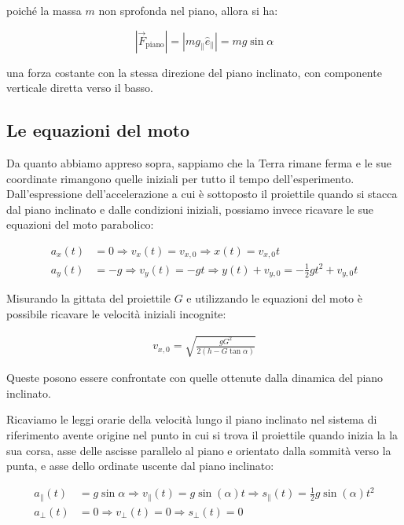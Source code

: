 \documentclass{article}
\begin{document}
poiché la massa $m$ non sprofonda nel piano, allora si ha:

\begin{equation}
|\vec{F}_\text{piano}| =  |mg_\parallel\hat{e}_\parallel| = mg \sin\alpha
\end{equation}

una forza costante con la stessa direzione del piano inclinato,
con componente verticale diretta verso il basso.

\subsection{Le equazioni del moto}
Da quanto abbiamo appreso sopra, sappiamo che la Terra rimane ferma
e le sue coordinate rimangono quelle iniziali per tutto il tempo
dell'esperimento.
Dall'espressione dell'accelerazione a cui è sottoposto il proiettile
quando si stacca dal piano inclinato e dalle condizioni iniziali,
possiamo invece ricavare le sue equazioni del moto parabolico:

\begin{align}
a_x(t) &= 0 \Rightarrow v_x(t) = v_{x,0} \Rightarrow x(t) = v_{x,0}t \\
a_y(t) &= -g \Rightarrow v_y(t) = - g t \Rightarrow y(t) + v_{y,0} = - \frac{1}{2} g t^2 + v_{y,0} t  
\end{align}

Misurando la gittata del proiettile $G$ e utilizzando le equazioni del
moto è possibile ricavare le velocità iniziali incognite:

\begin{align}
v_{x,0} = \sqrt{\frac{gG^2}{2(h - G\tan \alpha)}} 
\end{align}

Queste posono essere  confrontate con quelle ottenute dalla dinamica del piano inclinato.

Ricaviamo le leggi orarie della velocità lungo il piano inclinato nel sistema di riferimento
avente origine nel punto in cui si trova il proiettile quando inizia la la sua corsa, asse delle
ascisse parallelo al piano e orientato dalla sommità verso la punta, e asse dello ordinate uscente
dal piano inclinato:

\begin{align}
a_\parallel(t) &= g \sin\alpha \Rightarrow v_\parallel(t) = g \sin(\alpha) t \Rightarrow s_\parallel(t) = \frac{1}{2} g \sin(\alpha) t^2 \\
a_\perp(t) &= 0 \Rightarrow v_\perp(t) = 0 \Rightarrow s_\perp(t) = 0
\end{align}
\end{document}
